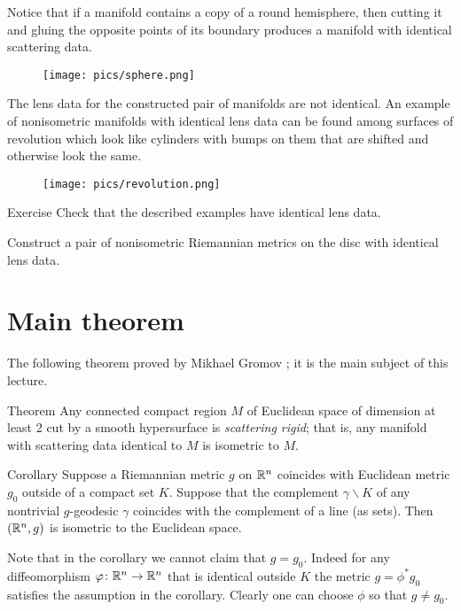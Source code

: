 Notice that if a manifold contains a copy of a round hemisphere, then cutting it and gluing the opposite points of its boundary produces a manifold with identical scattering data.
\begin{figure}[h!]
\centering
\texttt{[image: pics/sphere.png]}
\end{figure}
The lens data for the constructed pair of manifolds are not identical.
An example of nonisometric manifolds with identical lens data can be found among surfaces of revolution which look like cylinders with bumps on them that are shifted and otherwise look the same.
\begin{figure}[h!]
\centering
\texttt{[image: pics/revolution.png]}
\end{figure}

\begin{thm}{Exercise}
Check that the described examples have identical lens data.

Construct a pair of nonisometric Riemannian metrics on the disc with identical lens data.
\end{thm}

\section{Main theorem}

The following theorem proved by Mikhael Gromov \cite{gromov-1983};
it is the main subject of this lecture.

\begin{thm}{Theorem}\label{thm:magic-cloak}
Any connected compact region $M$ of Euclidean space of dimension at least 2 cut by a smooth hypersurface is \emph{scattering rigid};
that is, any manifold with scattering data identical to $M$ is isometric to $M$.
\end{thm}

\begin{thm}{Corollary}
Suppose a Riemannian metric $g$ on $\mathbb{R}^n$ coincides with Euclidean metric $g_0$ outside of a compact set $K$.
Suppose that the complement $\gamma\backslash K$ of any nontrivial $g$-geodesic $\gamma$ coincides with the complement of a line (as sets).
Then $(\mathbb{R}^n,g)$ is isometric to the Euclidean space.
\end{thm}

Note that in the corollary we cannot claim that $g=g_0$.
Indeed for any diffeomorphism $\varphi\colon\mathbb{R}^n\to\mathbb{R}^n$ that is identical outside $K$ the metric $g=\phi^*g_0$ satisfies the assumption in the corollary.
Clearly one can choose $\phi$ so that $g\ne g_0$.


